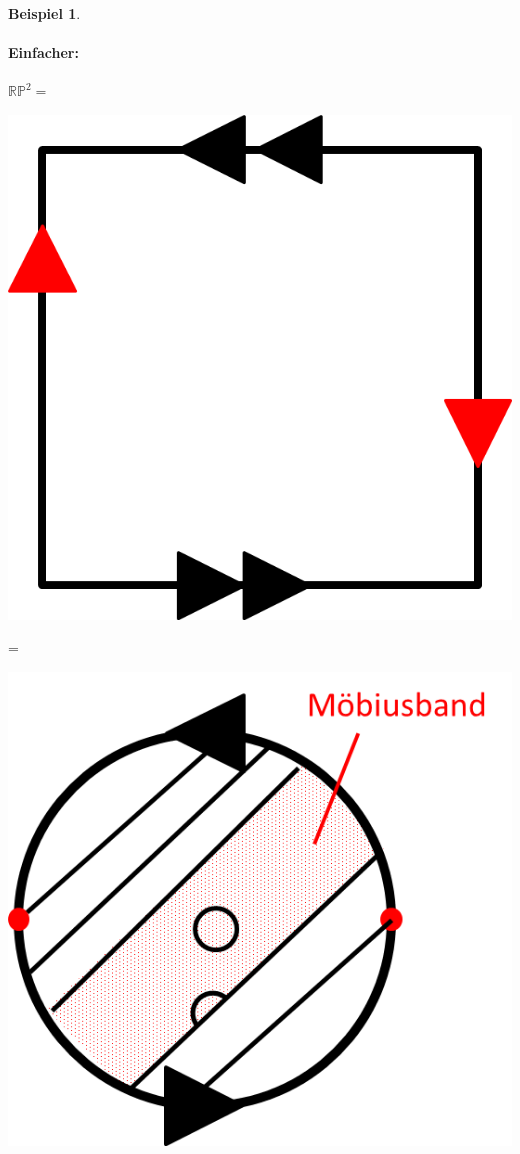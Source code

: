 \documentclass[a4paper,11pt,notitlepage]{report}
\theoremstyle{definition}
\newtheorem{example}{Beispiel}[chapter]
\newcommand{\R}{{\ensuremath{\mathbb{R}}}}
\newcommand{\Prim}{{\ensuremath{\mathbb{P}}}}
\begin{document}
\begin{example}
	\paragraph{Einfacher:}
	$\R \Prim^2 = $ \begin{center}
	 	\includegraphics[scale=0.5]{images/2012_01_10_Bild07.png}
	 \end{center} = \begin{center}
	 	\includegraphics[scale=0.5]{images/2012_01_10_Bild08.png}

\end{center}
\end{example}
\end{document}
